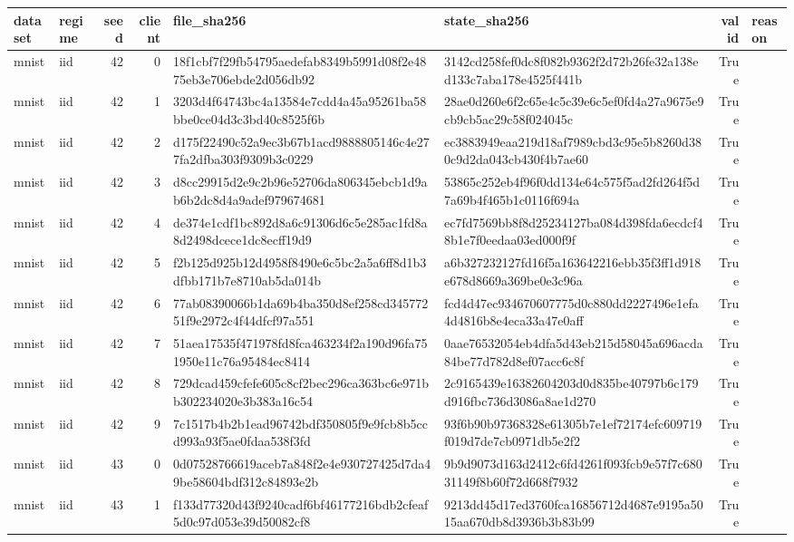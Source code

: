 \begin{tabular}{llrrllrl}
\toprule
dataset & regime & seed & client & file\_sha256 & state\_sha256 & valid & reason \\
\midrule
mnist & iid & 42 & 0 & 18f1cbf7f29fb54795aedefab8349b5991d08f2e4875eb3e706ebde2d056db92 & 3142cd258fef0dc8f082b9362f2d72b26fe32a138ed133c7aba178e4525f441b & True &  \\
mnist & iid & 42 & 1 & 3203d4f64743bc4a13584e7cdd4a45a95261ba58bbe0ce04d3c3bd40c8525f6b & 28ae0d260e6f2c65e4c5c39e6c5ef0fd4a27a9675e9cb9cb5ac29c58f024045c & True &  \\
mnist & iid & 42 & 2 & d175f22490c52a9ec3b67b1acd9888805146c4e277fa2dfba303f9309b3c0229 & ec3883949eaa219d18af7989cbd3c95e5b8260d380c9d2da043cb430f4b7ae60 & True &  \\
mnist & iid & 42 & 3 & d8cc29915d2e9c2b96e52706da806345ebcb1d9ab6b2dc8d4a9adef979674681 & 53865c252eb4f96f0dd134e64c575f5ad2fd264f5d7a69b4f465b1c0116f694a & True &  \\
mnist & iid & 42 & 4 & de374e1cdf1bc892d8a6c91306d6c5e285ac1fd8a8d2498dcece1dc8ecff19d9 & ec7fd7569bb8f8d25234127ba084d398fda6ecdcf48b1e7f0eedaa03ed000f9f & True &  \\
mnist & iid & 42 & 5 & f2b125d925b12d4958f8490e6c5bc2a5a6ff8d1b3dfbb171b7e8710ab5da014b & a6b327232127fd16f5a163642216ebb35f3ff1d918e678d8669a369be0e3c96a & True &  \\
mnist & iid & 42 & 6 & 77ab08390066b1da69b4ba350d8ef258cd34577251f9e2972c4f44dfcf97a551 & fcd4d47ec934670607775d0c880dd2227496e1efa4d4816b8e4eca33a47e0aff & True &  \\
mnist & iid & 42 & 7 & 51aea17535f471978fd8fca463234f2a190d96fa751950e11c76a95484ec8414 & 0aae76532054eb4dfa5d43eb215d58045a696acda84be77d782d8ef07acc6c8f & True &  \\
mnist & iid & 42 & 8 & 729dcad459cfefe605c8cf2bec296ca363bc6e971bb302234020e3b383a16c54 & 2c9165439e16382604203d0d835be40797b6c179d916fbc736d3086a8ae1d270 & True &  \\
mnist & iid & 42 & 9 & 7c1517b4b2b1ead96742bdf350805f9e9fcb8b5ccd993a93f5ae0fdaa538f3fd & 93f6b90b97368328e61305b7e1ef72174efc609719f019d7de7cb0971db5e2f2 & True &  \\
mnist & iid & 43 & 0 & 0d07528766619aceb7a848f2e4e930727425d7da49be58604bdf312c84893e2b & 9b9d9073d163d2412c6fd4261f093fcb9e57f7c68031149f8b60f72d668f7932 & True &  \\
mnist & iid & 43 & 1 & f133d77320d43f9240cadf6bf46177216bdb2cfeaf5d0c97d053e39d50082cf8 & 9213dd45d17ed3760fca16856712d4687e9195a5015aa670db8d3936b3b83b99 & True &  \\

\end{tabular}
